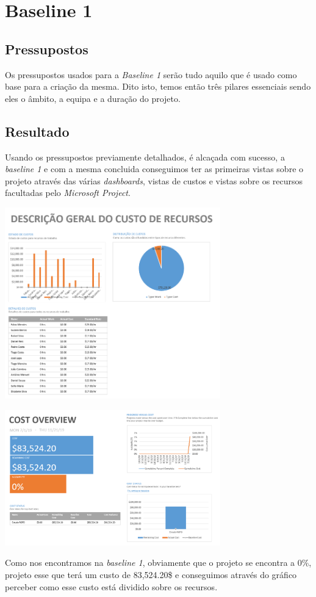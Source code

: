 \section{Baseline 1}
\subsection{Pressupostos}

Os pressupostos usados para a \emph{Baseline 1} serão tudo aquilo que é usado como base para a criação da mesma. Dito isto, temos então três pilares essenciais sendo eles o âmbito, a equipa e a duração do projeto.




\subsection{Resultado}

Usando os pressupostos previamente detalhados, é alcaçada com sucesso, a \textit{baseline 1} e com a mesma concluida conseguimos ter as primeiras vistas sobre o projeto através das várias \textit{dashboards}, vistas de custos e vistas sobre os recursos facultadas pelo \textit{Microsoft Project}.

\begin{center}
    \includegraphics[width=0.7\textwidth]{media/baseline1Costs.PNG}
\end{center}

\begin{center}
    \includegraphics[width=0.7\textwidth]{media/baseline1CostOverview.PNG}
\end{center}

Como nos encontramos na \textit{baseline 1}, obviamente que o projeto se encontra a 0\%, projeto esse que terá um custo de 83,524.20\$ e conseguimos através do gráfico perceber como esse custo está dividido sobre os recursos.